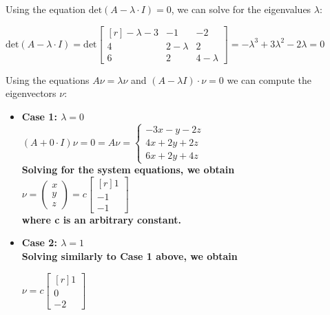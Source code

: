 \documentclass[11pt, oneside, letter]{article}
\begin{document}
\begin{enumerate}
	\vspace{1ex}
	Using the equation $\mbox{det}(A - \lambda \cdot I) = 0$, we can solve for the eigenvalues $\lambda$:
	
	\begin{center}
	$\mbox{det}(A - \lambda \cdot I) = \mbox{det}\begin{bmatrix*}[r]
	-\lambda-3 & -1 & -2 \\ 4 & 2-\lambda & 2 \\ 6 & 2 & 4-\lambda
	\end{bmatrix*} = -\lambda^3 + 3\lambda^2 - 2\lambda = 0
	$
	\\
	\vspace{3ex}
	\end{center}
	
	Using the equations $A\nu = \lambda\nu$ and $(A - \lambda I)\cdot \nu = 0$ we can compute the eigenvectors $\nu$:
	
		\begin{itemize}
		\item \bf Case 1: $\lambda = 0$ \rm \\
		
		\centering
		$(A + 0 \cdot I)\nu = 0 = A \nu = \left\{ \begin{array}{r} -3x - y - 2z \\ 4x + 2y + 2z \\ 6x + 2y + 4z \end{array} \right.$ \\
		\flushleft
		Solving for the system equations, we obtain \\
		\centering
		$\nu =\left( \begin{array}{r} x \\ y \\ z \end{array} \right) = c\begin{bmatrix*}[r] 1 \\ -1 \\ -1 
		\end{bmatrix*}$ \\
		
		\flushleft
		where c is an arbitrary constant.
		
		\item \bf Case 2: $\lambda = 1$ \rm \\
		Solving similarly to Case 1 above, we obtain
		
		\centering
		$\nu = c\begin{bmatrix*}[r] 1 \\ 0 \\ -2 \end{bmatrix*}$ \\
		

\end{itemize}
\end{enumerate}
\end{document}
